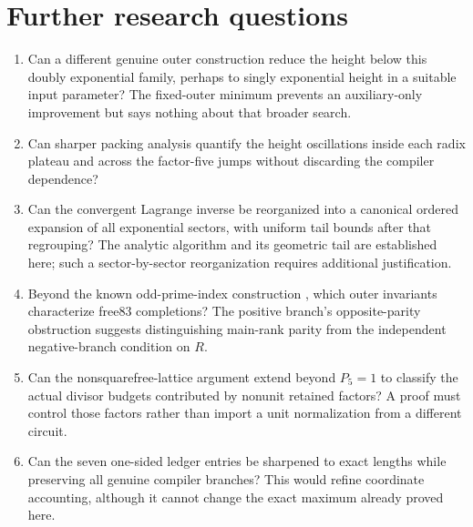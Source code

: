 \documentclass[11pt,letterpaper]{article}
\newcommand{\fupR}{0}
\renewcommand{\thesection}{\fupR.\arabic{section}}
\renewcommand{\theHsection}{\fupR.\arabic{section}}
\newcommand{\fupappendix}{%
  \setcounter{section}{0}%
  \renewcommand{\thesection}{\fupR.\Alph{section}}%
  \renewcommand{\theHsection}{\fupR.\Alph{section}}}
\theoremstyle{definition}\newtheorem{definition}[theorem]{Definition}
\theoremstyle{remark}\newtheorem{remark}[theorem]{Remark}
\begin{document}
\section{Further research questions}
\label{fup:eh:sec:future}
\begin{enumerate}
\item Can a different genuine outer construction reduce the height
below this doubly exponential family, perhaps to singly exponential
height in a suitable input parameter? The fixed-outer minimum prevents
an auxiliary-only improvement but says nothing about that broader search.
\item Can sharper packing analysis quantify the height oscillations
inside each radix plateau and across the factor-five jumps without
discarding the compiler dependence?
\item Can the convergent Lagrange inverse be reorganized into a
canonical ordered expansion of all exponential sectors, with uniform
tail bounds after that regrouping? The analytic algorithm and its
geometric tail are established here; such a sector-by-sector
reorganization requires additional justification.
\item Beyond the known odd-prime-index construction
\cite{fup:eh:primecollapse}, which outer invariants characterize free83 completions?
The positive branch's opposite-parity obstruction suggests distinguishing
main-rank parity from the independent negative-branch condition on $R$.
\item Can the nonsquarefree-lattice argument extend beyond $P_5=1$
to classify the actual divisor budgets contributed by nonunit retained
factors? A proof must control those factors rather than import a unit
normalization from a different circuit.
\item Can the seven one-sided ledger entries be sharpened to exact
lengths while preserving all genuine compiler branches? This would
refine coordinate accounting, although it cannot change the exact
maximum already proved here.
\end{enumerate}

\fupappendix
\end{document}
